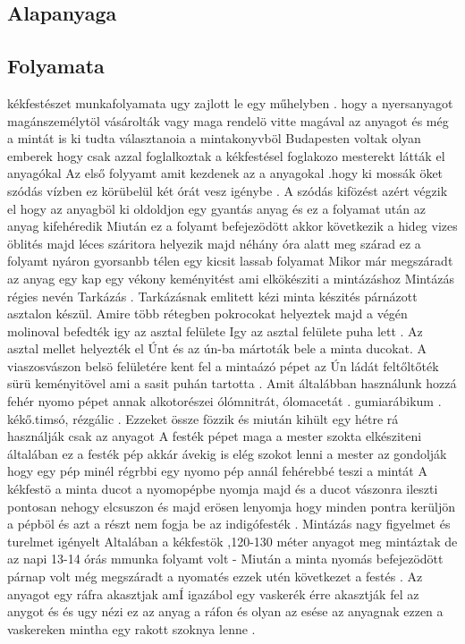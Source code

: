 \documentclass[fontsize=12pt, appendixprefix=true]{scrreprt}
\begin{document}
\subsection{Alapanyaga}


\subsection{Folyamata}
kékfestészet  munkafolyamata ugy zajlott le egy műhelyben . hogy a nyersanyagot magánszemélytöl vásárolták vagy maga rendelö vitte magával az anyagot és még a mintát is ki tudta választanoia  a mintakonyvböl
Budapesten voltak olyan emberek hogy csak azzal foglalkoztak a kékfestésel foglakozo mesterekt látták el anyagókal
Az első  folyyamt amit kezdenek az a anyagokal .hogy ki mossák öket szódás vízben ez körübelül két órát vesz igénybe .
 A szódás kifözést azért végzik el hogy az anyagböl ki oldoldjon egy gyantás anyag és ez a folyamat után  az anyag kifehéredik
 Miután ez a folyamt befejezödött akkor következik a hideg vizes öblités majd léces száritora helyezik majd néhány óra alatt meg szárad ez a folyamt nyáron gyorsanbb télen egy kicsit lassab folyamat 
Mikor már megszáradt az anyag egy kap egy vékony keményitést ami elkökésziti a mintázáshoz 
Mintázás régies nevén Tarkázás .
Tarkázásnak emlitett kézi minta készités  párnázott asztalon készül.
Amire több rétegben pokrocokat helyeztek majd a végén molinoval befedték igy az asztal felülete 
Igy az asztal felülete puha lett .
Az asztal mellet helyezték el Únt és az ún-ba mártoták bele a minta ducokat.
A viaszosvászon belsö felületére kent fel a mintaázó pépet az Ún 
ládát feltőltőték sürü keményitövel ami a sasit puhán tartotta .
Amit általábban használunk hozzá  fehér nyomo pépet annak alkotorészei ólómnitrát, ólomacetát . gumiarábikum . kékő.timsó, rézgálic .
Ezzeket össze fözzik és miután kihült egy hétre rá használják csak az anyagot 
A festék pépet  maga a mester szokta elkésziteni általában ez a festék pép akkár ávekig is elég szokot lenni a mester az gondolják hogy egy pép minél régrbbi egy nyomo pép annál fehérebbé teszi a mintát
A kékfestö a minta  ducot a nyomopépbe nyomja majd és a ducot vászonra ileszti pontosan nehogy elcsuszon és majd erösen lenyomja hogy minden pontra kerüljön a pépböl és azt a részt nem fogja be az indigófesték .
Mintázás nagy figyelmet és turelmet igényelt 
Altalában a kékfestök  ,120-130 méter anyagot meg mintáztak de az napi 13-14 órás mmunka folyamt volt -
Miután a minta nyomás befejezödött  párnap volt még megszáradt a nyomatés ezzek utén következet a festés .
Az anyagot egy ráfra akasztjak   amÍ  igazábol egy vaskerék érre akasztják fel az anygot és és ugy nézi ez az anyag a ráfon és olyan az esése az anyagnak ezzen a vaskereken mintha egy rakott szoknya lenne .
\end{document}
